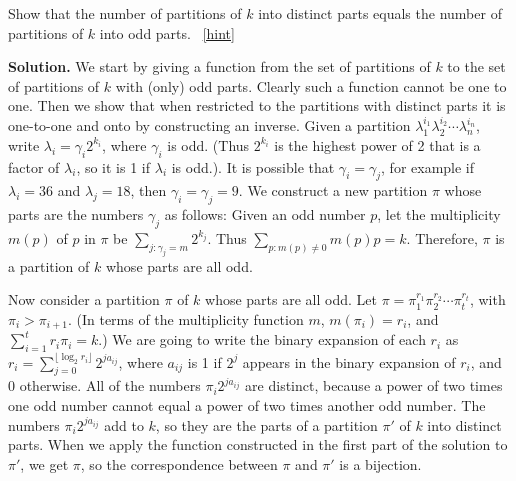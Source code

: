 \documentclass{book}
\begin{document}
\setcounter{project}{314}
\addtocounter{project}{-1}
\begin{activity}[]\label{activity-307}
\hypertarget{p-1617}{}%
Show that the number of partitions of \(k\) into distinct parts equals the number of partitions of \(k\) into odd parts.%
~\hfill{\tiny\hyperlink{a-314}{[hint]}\hypertarget{q-314}{}}\par\smallskip%
\noindent\textbf{Solution.}\hypertarget{solution-242}{}\quad%
\hypertarget{p-1619}{}%
We start by giving a function from the set of partitions of \(k\) to the set of partitions of \(k\) with (only) odd parts. Clearly such a function cannot be one to one. Then we show that when restricted to the partitions with distinct parts it is one-to-one and onto by constructing an inverse. Given a partition \(\lambda_1^{i_1}\lambda_2^{i_2}\cdots\lambda_n^{i_n}\), write \(\lambda_i=\gamma_i2^{k_i}\), where \(\gamma_i\) is odd. (Thus \(2^{k_i}\) is the highest power of 2 that is a factor of \(\lambda_i\), so it is 1 if \(\lambda_i\) is odd.). It is possible that \(\gamma_i=\gamma_j\), for example if \(\lambda_i=36\) and \(\lambda_j=18\), then \(\gamma_i=\gamma_j=9\). We construct a new partition \(\pi\) whose parts are the numbers \(\gamma_j\) as follows: Given an odd number \(p\), let the multiplicity \(m(p)\) of \(p\) in \(\pi\) be \(\sum_{j: \gamma_j=m} 2^{k_j}\). Thus \(\sum_{p: m(p)\not=0}m(p)p = k\). Therefore, \(\pi\) is a partition of \(k\) whose parts are all odd.%
\par
\hypertarget{p-1620}{}%
Now consider a partition \(\pi\) of \(k\) whose parts are all odd. Let \(\pi=\pi_1^{r_1}\pi_2^{r_2}\cdots \pi_t^{r_t}\), with \(\pi_i>\pi_{i+1}\). (In terms of the multiplicity function \(m\), \(m(\pi_i) =r_i\), and \(\sum_{i=1}^t r_i\pi_i = k\).) We are going to write the binary expansion of each \(r_i\) as \(r_i = \sum_{j= 0}^{\lfloor \log_2 r_i\rfloor} 2^{ja_{ij}}\), where \(a_{ij}\) is 1 if \(2^j\) appears in the binary expansion of \(r_i\), and 0 otherwise. All of the numbers \(\pi_i2^{ja_{ij}}\) are distinct, because a power of two times one odd number cannot equal a power of two times another odd number. The numbers \(\pi_i2^{ja_{ij}}\) add to \(k\), so they are the parts of a partition \(\pi'\) of \(k\) into distinct parts. When we apply the function constructed in the first part of the solution to \(\pi'\), we get \(\pi\), so the correspondence between \(\pi\) and \(\pi'\) is a bijection.%
\end{activity}
\end{document}
